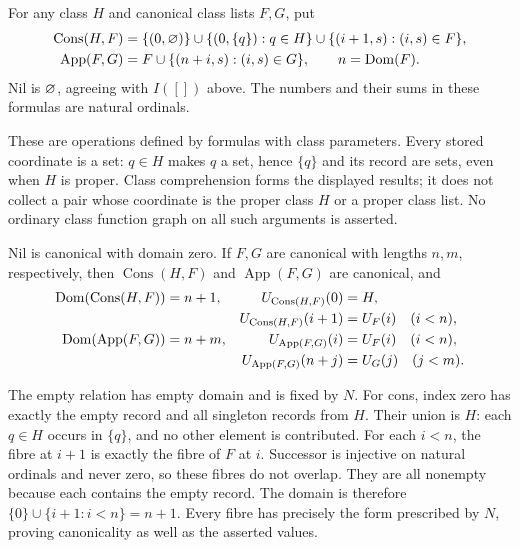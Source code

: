 \begin{definition}
For any class $H$ and canonical class lists $F,G$, put
\[
\begin{aligned}
\operatorname{Cons}(H,F)
 &=\{(0,\varnothing)\}\cup\{(0,\{q\}):q\in H\}
   \cup\{(i+1,s):(i,s)\in F\},\\
\operatorname{App}(F,G)
 &=F\cup\{(n+i,s):(i,s)\in G\},\qquad n=\mathrm{Dom}(F).
\end{aligned}
\]
Nil is $\varnothing$, agreeing with $I([])$ above. The numbers and
their sums in these formulas are natural ordinals.
\end{definition}

These are operations defined by formulas with class parameters.
Every stored coordinate is a set: $q\in H$ makes $q$ a set, hence
$\{q\}$ and its record are sets, even when $H$ is proper. Class
comprehension forms the displayed results; it does not collect a pair
whose coordinate is the proper class $H$ or a proper class list.
No ordinary class function graph on all such arguments is asserted.

\begin{theorem}
Nil is canonical with domain zero. If $F,G$ are canonical with lengths
$n,m$, respectively, then $\operatorname{Cons}(H,F)$ and
$\operatorname{App}(F,G)$ are canonical, and
\[
\begin{aligned}
\mathrm{Dom}(\operatorname{Cons}(H,F))&=n+1,&
U_{\operatorname{Cons}(H,F)}(0)&=H,\\
&&U_{\operatorname{Cons}(H,F)}(i+1)&=U_F(i)\quad(i<n),\\
\mathrm{Dom}(\operatorname{App}(F,G))&=n+m,&
U_{\operatorname{App}(F,G)}(i)&=U_F(i)\quad(i<n),\\
&&U_{\operatorname{App}(F,G)}(n+j)&=U_G(j)\quad(j<m).
\end{aligned}
\]
\end{theorem}
\Proof
The empty relation has empty domain and is fixed by $N$.
For cons, index zero has exactly the empty record and all singleton
records from $H$. Their union is $H$: each $q\in H$ occurs in
$\{q\}$, and no other element is contributed. For each $i<n$,
the fibre at $i+1$ is exactly the fibre of $F$ at $i$. Successor is
injective on natural ordinals and never zero, so these fibres do not
overlap. They are all nonempty because each contains the empty record.
The domain is therefore $\{0\}\cup\{i+1:i<n\}=n+1$.
Every fibre has precisely the form prescribed by $N$, proving canonicality
as well as the asserted values.

